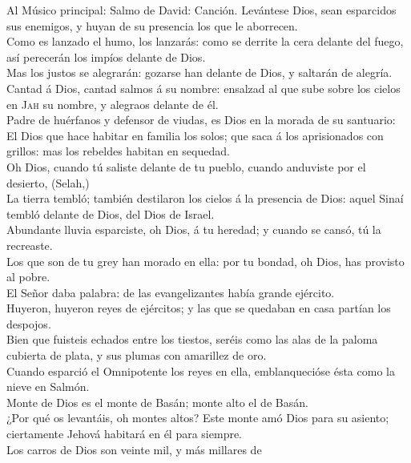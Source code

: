  Al Músico principal: Salmo de David: Canción. Levántese
Dios, sean esparcidos sus enemigos, y huyan de su presencia los que le
aborrecen.\\
 Como es lanzado el humo, los lanzarás: como se derrite la
cera delante del fuego, así perecerán los impíos delante de Dios.\\
 Mas los justos se alegrarán: gozarse han delante de Dios,
y saltarán de alegría.\\
 Cantad á Dios, cantad salmos á su nombre: ensalzad al que
sube sobre los cielos en \textsc{Jah} su nombre, y alegraos delante de
él.\\
 Padre de huérfanos y defensor de viudas, es Dios en la
morada de su santuario:\\
 El Dios que hace habitar en familia los solos; que saca á
los aprisionados con grillos: mas los rebeldes habitan en sequedad.\\
 Oh Dios, cuando tú saliste delante de tu pueblo, cuando
anduviste por el desierto, (Selah,)\\
 La tierra tembló; también destilaron los cielos á la
presencia de Dios: aquel Sinaí tembló delante de Dios, del Dios de
Israel.\\
 Abundante lluvia esparciste, oh Dios, á tu heredad; y
cuando se cansó, tú la recreaste.\\
 Los que son de tu grey han morado en ella: por tu
bondad, oh Dios, has provisto al pobre.\\
 El Señor daba palabra: de las evangelizantes había
grande ejército.\\
 Huyeron, huyeron reyes de ejércitos; y las que se
quedaban en casa partían los despojos.\\
 Bien que fuisteis echados entre los tiestos, seréis como
las alas de la paloma cubierta de plata, y sus plumas con amarillez de
oro.\\
 Cuando esparció el Omnipotente los reyes en ella,
emblanquecióse ésta como la nieve en Salmón.\\
 Monte de Dios es el monte de Basán; monte alto el de
Basán.\\
 ¿Por qué os levantáis, oh montes altos? Este monte amó
Dios para su asiento; ciertamente Jehová habitará en él para siempre.\\
 Los carros de Dios son veinte mil, y más millares de
